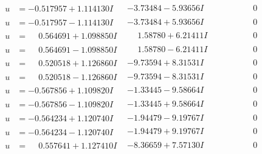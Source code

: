 \documentclass[1p]{elsarticle_modified}
\theoremstyle{definition}
\begin{document}
$$\begin{array}{c|c|c}
\begin{aligned}
u &= -0.517957 + 1.114130 I\end{aligned}
 & -3.73484 - 5.93656 I & \phantom{-0.000000 } 0 \\ \hline\begin{aligned}
u &= -0.517957 - 1.114130 I\end{aligned}
 & -3.73484 + 5.93656 I & \phantom{-0.000000 } 0 \\ \hline\begin{aligned}
u &= \phantom{-}0.564691 + 1.098850 I\end{aligned}
 & \phantom{-}1.58780 + 6.21411 I & \phantom{-0.000000 } 0 \\ \hline\begin{aligned}
u &= \phantom{-}0.564691 - 1.098850 I\end{aligned}
 & \phantom{-}1.58780 - 6.21411 I & \phantom{-0.000000 } 0 \\ \hline\begin{aligned}
u &= \phantom{-}0.520518 + 1.126860 I\end{aligned}
 & -9.73594 + 8.31531 I & \phantom{-0.000000 } 0 \\ \hline\begin{aligned}
u &= \phantom{-}0.520518 - 1.126860 I\end{aligned}
 & -9.73594 - 8.31531 I & \phantom{-0.000000 } 0 \\ \hline\begin{aligned}
u &= -0.567856 + 1.109820 I\end{aligned}
 & -1.33445 - 9.58664 I & \phantom{-0.000000 } 0 \\ \hline\begin{aligned}
u &= -0.567856 - 1.109820 I\end{aligned}
 & -1.33445 + 9.58664 I & \phantom{-0.000000 } 0 \\ \hline\begin{aligned}
u &= -0.564234 + 1.120740 I\end{aligned}
 & -1.94479 - 9.19767 I & \phantom{-0.000000 } 0 \\ \hline\begin{aligned}
u &= -0.564234 - 1.120740 I\end{aligned}
 & -1.94479 + 9.19767 I & \phantom{-0.000000 } 0 \\ \hline\begin{aligned}
u &= \phantom{-}0.557641 + 1.127410 I\end{aligned}
 & -8.36659 + 7.57130 I & \phantom{-0.000000 } 0 \\ \hline\begin{aligned}

\end{aligned}
\end{array}$$
\end{document}
